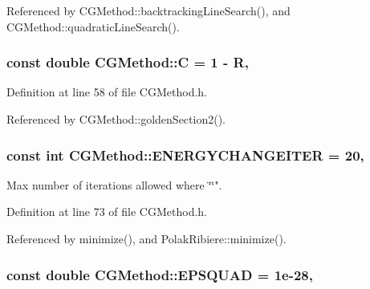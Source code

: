 Referenced by C\+G\+Method\+::backtracking\+Line\+Search(), and C\+G\+Method\+::quadratic\+Line\+Search().

\hypertarget{classCGMethod_af8587ca1c0394c244ce84fe8a6ad29ff}{
\subsubsection[{C}]{\setlength{\rightskip}{0pt plus 5cm}const double C\+G\+Method\+::\+C = 1 -\/ {\bf R}\hspace{0.3cm}{\ttfamily [protected]}, {\ttfamily [inherited]}}}\label{classCGMethod_af8587ca1c0394c244ce84fe8a6ad29ff}


Definition at line 58 of file C\+G\+Method.\+h.



Referenced by C\+G\+Method\+::golden\+Section2().

\hypertarget{classCGMethod_aaee1e11813855cc66c360f7cb3d9665a}{
\subsubsection[{E\+N\+E\+R\+G\+Y\+C\+H\+A\+N\+G\+E\+I\+T\+E\+R}]{\setlength{\rightskip}{0pt plus 5cm}const int C\+G\+Method\+::\+E\+N\+E\+R\+G\+Y\+C\+H\+A\+N\+G\+E\+I\+T\+E\+R = 20\hspace{0.3cm}{\ttfamily [protected]}, {\ttfamily [inherited]}}}\label{classCGMethod_aaee1e11813855cc66c360f7cb3d9665a}


Max number of iterations allowed where \char`\"{}\char`\"{}". 



Definition at line 73 of file C\+G\+Method.\+h.



Referenced by minimize(), and Polak\+Ribiere\+::minimize().

\hypertarget{classCGMethod_adb2a688fe52a8729d703d81e52b9fdb3}{
\subsubsection[{E\+P\+S\+Q\+U\+A\+D}]{\setlength{\rightskip}{0pt plus 5cm}const double C\+G\+Method\+::\+E\+P\+S\+Q\+U\+A\+D = 1e-\/28\hspace{0.3cm}{\ttfamily [protected]}, {\ttfamily [inherited]}}}\label{classCGMethod_adb2a688fe52a8729d703d81e52b9fdb3}


